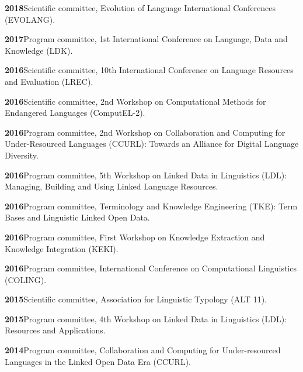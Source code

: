 \documentclass[11pt]{article}
\newcommand{\hangpara}{
 \setlength{\parindent}{0in} %
 \hangindent=0.42in %
}
\begin{document}
\vskip 6pt
\hangpara
{\bf 2018}\hspace{1ex}Scientific committee, Evolution of Language International Conferences (EVOLANG).

\vskip 6pt
\hangpara
{\bf 2017}\hspace{1ex}Program committee, 1st International Conference on Language, Data and Knowledge (LDK).

\vskip 6pt
\hangpara
{\bf 2016}\hspace{1ex}Scientific committee, 10th International Conference on Language Resources and Evaluation (LREC).

\vskip 6pt
\hangpara
{\bf 2016}\hspace{1ex}Scientific committee, 2nd Workshop on Computational Methods for Endangered Languages (ComputEL-2).

\vskip 6pt
\hangpara
{\bf 2016}\hspace{1ex}Program committee, 2nd Workshop on Collaboration and Computing for Under-Resourced Languages (CCURL): Towards an Alliance for Digital Language Diversity.

\vskip 6pt
\hangpara
{\bf 2016}\hspace{1ex}Program committee, 5th Workshop on Linked Data in Linguistics (LDL): Managing, Building and Using Linked Language Resources.

\vskip 6pt
\hangpara
{\bf 2016}\hspace{1ex}Program committee, Terminology and Knowledge Engineering (TKE): Term Bases and Linguistic Linked Open Data.

\vskip 6pt
\hangpara
{\bf 2016}\hspace{1ex}Program committee, First Workshop on Knowledge Extraction and Knowledge Integration (KEKI).

\vskip 6pt
\hangpara
{\bf 2016}\hspace{1ex}Program committee, International Conference on Computational Linguistics (COLING).

\vskip 6pt
\hangpara
{\bf 2015}\hspace{1ex}Scientific committee, Association for Linguistic Typology (ALT 11).

\vskip 6pt
\hangpara
{\bf 2015}\hspace{1ex}Program committee, 4th Workshop on Linked Data in Linguistics (LDL): Resources and Applications.

\vskip 6pt
\hangpara
{\bf 2014}\hspace{1ex}Program committee, Collaboration and Computing for Under-resourced Languages in the Linked Open Data Era (CCURL).
\end{document}
